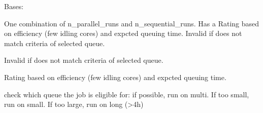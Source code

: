 \documentclass[letterpaper,10pt,english]{sphinxmanual}
\begin{document}
\begin{fulllineitems}
\label{\detokenize{machine:machine.cray.Option}}
Bases: 

One combination of n\_parallel\_runs and n\_sequential\_runs. 
Has a Rating based on efficiency (few idling cores) and expcted 
queuing time.
Invalid if does not match criteria of selected queue.

\begin{fulllineitems}
\label{\detokenize{machine:machine.cray.Option.check_valid}}
Invalid if does not match criteria of selected queue.

\end{fulllineitems}


\begin{fulllineitems}
\label{\detokenize{machine:machine.cray.Option.rating}}
Rating based on efficiency (few idling cores) and expcted 
queuing time.

\end{fulllineitems}


\end{fulllineitems}


\begin{fulllineitems}
\label{\detokenize{machine:machine.cray.get_queue}}
check which queue the job is eligible for: 
if possible, run on multi. If too small, run on small. 
If too large, run on long (\textgreater{}4h)

\end{fulllineitems}

\end{document}
